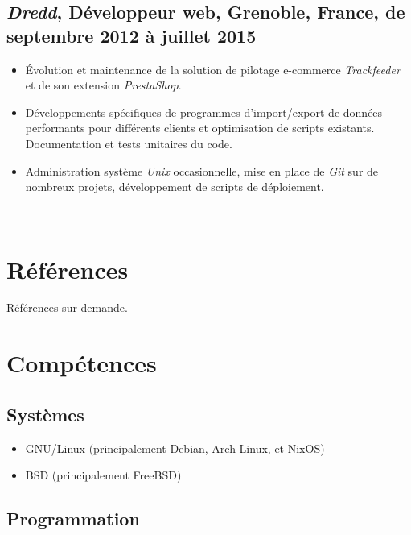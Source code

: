 \documentclass[a4paper]{article}
\begin{document}
\subsection*{
  \textit{Dredd},
  \textbf{Développeur web},
  Grenoble, France,
  de septembre 2012 à juillet 2015
}

\begin{itemize}
  \item Évolution et maintenance de la solution de pilotage e-commerce
  \textit{Trackfeeder} et de son extension \textit{PrestaShop}.
  \item Développements spécifiques de programmes d'import/export de
  données performants pour différents clients et optimisation de scripts
  existants. Documentation et tests unitaires du code.
  \item Administration système \textit{Unix} occasionnelle, mise en
  place de \textit{Git} sur de nombreux projets, développement de
  scripts de déploiement.

\end{itemize}



~

\section*{Références}

Références sur demande.

\clearpage

\section*{Compétences}

\subsection*{Systèmes}

\begin{itemize}
  \item GNU/Linux (principalement Debian, Arch Linux, et NixOS)
  \item BSD (principalement FreeBSD)
\end{itemize}

\subsection*{Programmation}
\end{document}

